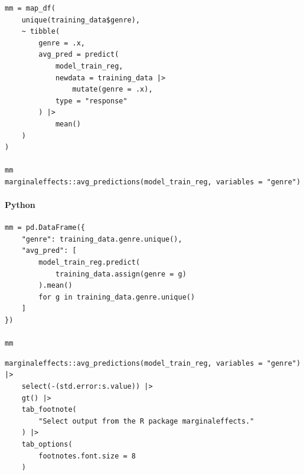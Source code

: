 \documentclass[
  letterpaper,
]{krantz}
\let\oldparagraph\paragraph
\renewcommand{\paragraph}[1]{\oldparagraph{#1}\mbox{}}
\begin{document}
\begin{verbatim}
mm = map_df(
    unique(training_data$genre), 
    ~ tibble(
        genre = .x,
        avg_pred = predict(
            model_train_reg, 
            newdata = training_data |> 
                mutate(genre = .x), 
            type = "response"
        ) |> 
            mean()
    )
)

mm 
marginaleffects::avg_predictions(model_train_reg, variables = "genre")
\end{verbatim}

\paragraph{Python}\label{python-31}

\begin{verbatim}
mm = pd.DataFrame({
    "genre": training_data.genre.unique(),
    "avg_pred": [
        model_train_reg.predict(
            training_data.assign(genre = g)
        ).mean()
        for g in training_data.genre.unique()
    ]
})

mm
\end{verbatim}

\begin{verbatim}
marginaleffects::avg_predictions(model_train_reg, variables = "genre") |> 
    select(-(std.error:s.value)) |>
    gt() |> 
    tab_footnote(
        "Select output from the R package marginaleffects."
    ) |> 
    tab_options(
        footnotes.font.size = 8
    )
\end{verbatim}

\setlength{\LTpost}{0mm}
\end{document}
